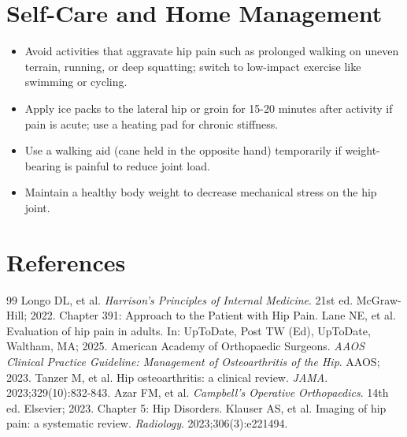 \section*{Self-Care and Home Management}
\begin{itemize}
  \item Avoid activities that aggravate hip pain such as prolonged walking on uneven terrain, running, or deep squatting; switch to low-impact exercise like swimming or cycling.
  \item Apply ice packs to the lateral hip or groin for 15-20 minutes after activity if pain is acute; use a heating pad for chronic stiffness.
  \item Use a walking aid (cane held in the opposite hand) temporarily if weight-bearing is painful to reduce joint load.
  \item Maintain a healthy body weight to decrease mechanical stress on the hip joint.
\end{itemize}

\section*{References}

\begin{thebibliography}{99}
 Longo DL, et al. \emph{Harrison's Principles of Internal Medicine}. 21st ed. McGraw-Hill; 2022. Chapter 391: Approach to the Patient with Hip Pain.
 Lane NE, et al. Evaluation of hip pain in adults. In: UpToDate, Post TW (Ed), UpToDate, Waltham, MA; 2025.
 American Academy of Orthopaedic Surgeons. \emph{AAOS Clinical Practice Guideline: Management of Osteoarthritis of the Hip}. AAOS; 2023.
 Tanzer M, et al. Hip osteoarthritis: a clinical review. \emph{JAMA}. 2023;329(10):832-843.
 Azar FM, et al. \emph{Campbell's Operative Orthopaedics}. 14th ed. Elsevier; 2023. Chapter 5: Hip Disorders.
 Klauser AS, et al. Imaging of hip pain: a systematic review. \emph{Radiology}. 2023;306(3):e221494.
\end{thebibliography}
